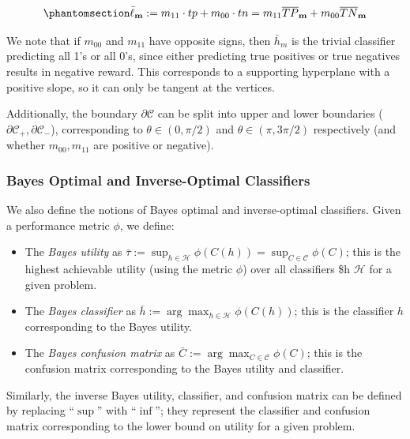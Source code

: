 \documentclass[
  letterpaper,
  numbers=noenddot,
  DIV=11]{scrreprt}
\providecommand{\tightlist}{%
  \setlength{\itemsep}{0pt}\setlength{\parskip}{0pt}}\usepackage{longtable,booktabs,array}
\theoremstyle{plain}
\theoremstyle{definition}
\theoremstyle{plain}
\theoremstyle{remark}
\begin{document}
\begin{equation}\phantomsection\label{eq-eq3.47}{\bar{\ell}_{\mathbf{m}} := m_{11} \cdot tp + m_{00} \cdot tn = m_{11} \overline{TP}_{\mathbf{m}} + m_{00} \overline{TN}_{\mathbf{m}}}\end{equation}

We note that if \(m_{00}\) and \(m_{11}\) have opposite signs, then
\(\bar{h}_m\) is the trivial classifier predicting all 1's or all 0's,
since either predicting true positives or true negatives results in
negative reward. This corresponds to a supporting hyperplane with a
positive slope, so it can only be tangent at the vertices.

Additionally, the boundary \(\partial \mathcal{C}\) can be split into
upper and lower boundaries
(\(\partial \mathcal{C}_{+}, \partial \mathcal{C}_{-}\)), corresponding
to \(\theta \in (0, \pi/2)\) and \(\theta \in (\pi, 3\pi/2)\)
respectively (and whether \(m_{00}, m_{11}\) are positive or negative).

\subsubsection*{Bayes Optimal and Inverse-Optimal
Classifiers}\label{bayes-optimal-and-inverse-optimal-classifiers}

We also define the notions of Bayes optimal and inverse-optimal
classifiers. Given a performance metric \(\phi\), we define:

\begin{itemize}
\tightlist
\item
  The \emph{Bayes utility} as
  \(\bar{\tau} := \sup_{h \in \mathcal{H}} \phi(C(h)) = \sup_{C \in \mathcal{C}} \phi(C)\);
  this is the highest achievable utility (using the metric \(\phi\))
  over all classifiers \$h \in \(\mathcal{H}\) for a given problem.
\item
  The \emph{Bayes classifier} as
  \(\bar{h} := \arg \max_{h \in \mathcal{H}} \phi(C(h))\); this is the
  classifier \(h\) corresponding to the Bayes utility.
\item
  The \emph{Bayes confusion matrix} as
  \(\bar{C} := \arg \max_{C \in \mathcal{C}} \phi(C)\); this is the
  confusion matrix corresponding to the Bayes utility and classifier.
\end{itemize}

Similarly, the inverse Bayes utility, classifier, and confusion matrix
can be defined by replacing ``\(\sup\)'' with ``\(\inf\)''; they
represent the classifier and confusion matrix corresponding to the lower
bound on utility for a given problem.
\end{document}
